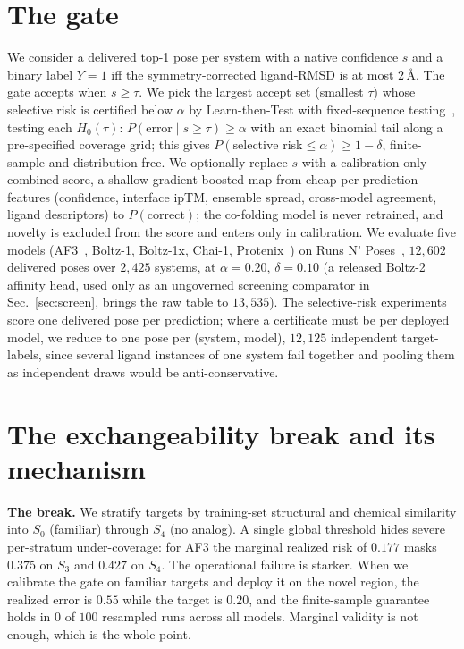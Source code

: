 \documentclass[10pt]{article}
\begin{document}
\section{The gate}\label{sec:method}
We consider a delivered top-1 pose per system with a native confidence $s$ and a binary label
$Y=1$ iff the symmetry-corrected ligand-RMSD is at most $2$\,\AA. The gate accepts when
$s\ge\tau$. We pick the largest accept set (smallest $\tau$) whose selective risk is certified
below $\alpha$ by Learn-then-Test with fixed-sequence testing~\citep{angelopoulos2021ltt}, testing
each $H_0(\tau)\!:\,P(\text{error}\mid s\ge\tau)\ge\alpha$ with an exact binomial tail along a
pre-specified coverage grid; this gives $P(\text{selective risk}\le\alpha)\ge 1-\delta$,
finite-sample and distribution-free. We optionally replace $s$ with a calibration-only combined
score, a shallow gradient-boosted map from cheap per-prediction features (confidence, interface
ipTM, ensemble spread, cross-model agreement, ligand descriptors) to $P(\text{correct})$; the
co-folding model is never retrained, and novelty is excluded from the score and enters only in
calibration. We evaluate five models
(AF3~\citep{af3}, Boltz-1, Boltz-1x, Chai-1, Protenix~\citep{boltz}) on Runs N' Poses~\citep{rnp},
$12{,}602$ delivered poses over $2{,}425$ systems, at $\alpha=0.20$, $\delta=0.10$ (a released
Boltz-2 affinity head, used only as an ungoverned screening comparator in Sec.~\ref{sec:screen},
brings the raw table to $13{,}535$). The selective-risk experiments score one delivered pose per
prediction; where a certificate must be per deployed model, we reduce to one pose per (system,
model), $12{,}125$ independent target-labels, since several ligand instances of one system fail
together and pooling them as independent draws would be anti-conservative.

\section{The exchangeability break and its mechanism}\label{sec:break}
\textbf{The break.} We stratify targets by training-set structural and chemical similarity into
$S_0$ (familiar) through $S_4$ (no analog). A single global threshold hides severe per-stratum
under-coverage: for AF3 the marginal realized risk of $0.177$ masks $0.375$ on $S_3$ and $0.427$
on $S_4$. The operational failure is starker. When we calibrate the gate on familiar targets and
deploy it on the novel region, the realized error is $0.55$ while the target is $0.20$, and the
finite-sample guarantee holds in $0$ of $100$ resampled runs across all models. Marginal
validity is not enough, which is the whole point.
\end{document}
